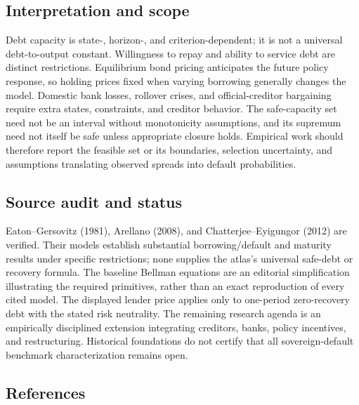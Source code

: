 \documentclass[11pt,a4paper]{article}
\begin{document}
\subsection*{Interpretation and scope}

Debt capacity is state-, horizon-, and criterion-dependent; it is not a universal debt-to-output constant. Willingness to repay and ability to service debt are distinct restrictions. Equilibrium bond pricing anticipates the future policy response, so holding prices fixed when varying borrowing generally changes the model. Domestic bank losses, rollover crises, and official-creditor bargaining require extra states, constraints, and creditor behavior. The safe-capacity set need not be an interval without monotonicity assumptions, and its supremum need not itself be safe unless appropriate closure holds. Empirical work should therefore report the feasible set or its boundaries, selection uncertainty, and assumptions translating observed spreads into default probabilities.

\subsection*{Source audit and status}

Eaton--Gersovitz (1981), Arellano (2008), and Chatterjee--Eyigungor (2012) are verified. Their models establish substantial borrowing/default and maturity results under specific restrictions; none supplies the atlas's universal safe-debt or recovery formula. The baseline Bellman equations are an editorial simplification illustrating the required primitives, rather than an exact reproduction of every cited model. The displayed lender price applies only to one-period zero-recovery debt with the stated risk neutrality. The remaining research agenda is an empirically disciplined extension integrating creditors, banks, policy incentives, and restructuring. Historical foundations do not certify that all sovereign-default benchmark characterization remains open.

\subsection*{References}
\end{document}
